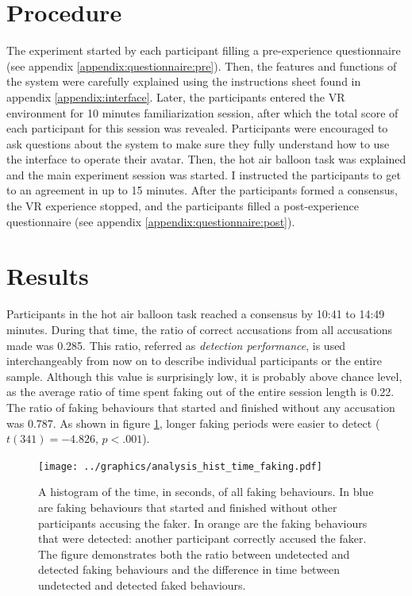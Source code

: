 \documentclass[]{simple-thesis}
\begin{document}
\section{Procedure}

The experiment started by each participant filling a pre-experience questionnaire (see appendix \ref{appendix:questionnaire:pre}).
Then, the features and functions of the system were carefully explained using the instructions sheet found in appendix \ref{appendix:interface}.
Later, the participants entered the VR environment for 10 minutes familiarization session, after which the total score of each participant for this session was revealed.
Participants were encouraged to ask questions about the system to make sure they fully understand how to use the interface to operate their avatar.
Then, the hot air balloon task was explained and the main experiment session was started.
I instructed the participants to get to an agreement in up to 15 minutes.
After the participants formed a consensus, the VR experience stopped, and the participants filled a post-experience questionnaire (see appendix \ref{appendix:questionnaire:post}).

\section{Results}

Participants in the hot air balloon task reached a consensus by 10:41 to 14:49 minutes.
During that time, the ratio of correct accusations from all accusations made was 0.285.
This ratio, referred as \textit{detection performance}, is used interchangeably from now on to describe individual participants or the entire sample.
Although this value is surprisingly low, it is probably above chance level, as the average ratio of time spent faking out of the entire session length is 0.22.
The ratio of faking behaviours that started and finished without any accusation was 0.787.
As shown in figure \ref{fig:analysis:hist_time_faking}, longer faking periods were easier to detect ($t(341) = -4.826$, $p < .001$).

\begin{figure}
  \centering
  \texttt{[image: ../graphics/analysis\_hist\_time\_faking.pdf]}
  \caption{A histogram of the time, in seconds, of all faking behaviours. In blue are faking behaviours that started and finished without other participants accusing the faker. In orange are the faking behaviours that were detected: another participant correctly accused the faker. The figure demonstrates both the ratio between undetected and detected faking behaviours and the difference in time between undetected and detected faked behaviours.}
  \label{fig:analysis:hist_time_faking}
\end{figure}
\end{document}
